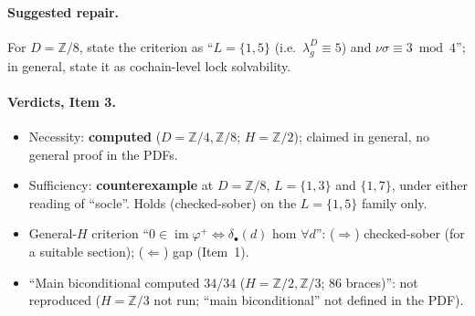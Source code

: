 \documentclass[11pt]{article}
\newcommand{\Z}{\mathbb{Z}}
\newcommand{\im}{\operatorname{im}}
\newcommand{\sh}{\hat\sigma}
\begin{document}
\paragraph{Suggested repair.} For $D=\Z/8$, state the criterion as ``$L=\{1,5\}$ (i.e.\
$\lambda^D_g\equiv5$) and $\nu\sh\equiv3\bmod4$''; in general, state it as cochain-level
lock solvability.

\paragraph{Verdicts, Item 3.}
\begin{itemize}[leftmargin=*]
\item Necessity: \textbf{computed} ($D=\Z/4,\Z/8$; $H=\Z/2$); claimed in general, no
general proof in the PDFs.
\item Sufficiency: \textbf{counterexample} at $D=\Z/8$, $L=\{1,3\}$ and $\{1,7\}$, under
either reading of ``socle''. Holds (checked-sober) on the $L=\{1,5\}$ family only.
\item General-$H$ criterion ``$0\in\im\varphi^+\iff\delta_\bullet(d)$ hom $\forall d$'':
($\Rightarrow$) checked-sober (for a suitable section); ($\Leftarrow$) gap (Item~1).
\item ``Main biconditional computed 34/34 ($H=\Z/2,\Z/3$; 86 braces)'': not reproduced
($H=\Z/3$ not run; ``main biconditional'' not defined in the PDF).
\end{itemize}
\end{document}
